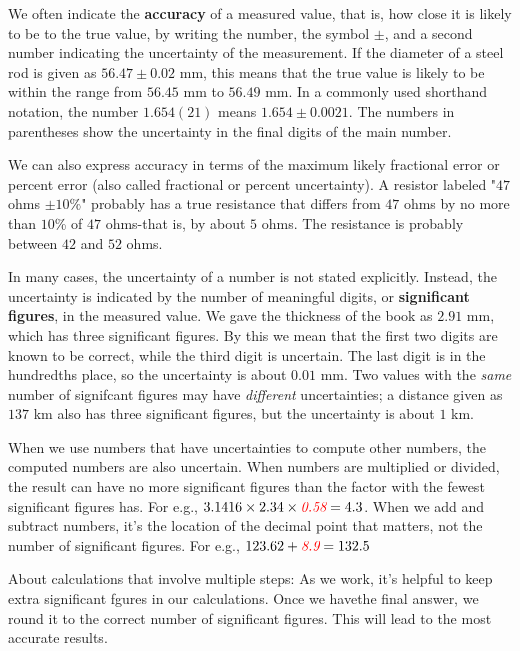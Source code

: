 We often indicate the \textbf{accuracy} of a measured value, that is, how close it is likely to be to the true value, by writing the number, the symbol $\pm$, and a second number indicating the uncertainty of the measurement. If the diameter of a steel rod is given as $56.47 \pm 0.02$ mm, this means that the true value is likely to be within the range from $56.45$ mm to $56.49$ mm. In a commonly used shorthand notation, the number $1.654(21)$ means $1.654 \pm 0.0021$. The numbers in parentheses show the uncertainty in the final digits of the main number.

We can also express accuracy in terms of the maximum likely fractional error or percent error (also called fractional or percent uncertainty). A resistor labeled "$47$ ohms $\pm 10\%$" probably has a true resistance that differs from $47$ ohms by no more than $10$\% of $47$ ohms-that is, by about $5$ ohms. The resistance is probably between $42$ and $52$ ohms. 

In many cases, the uncertainty of a number is not stated explicitly. Instead, the uncertainty is indicated by the number of meaningful digits, or \textbf{significant figures}, in the measured value. We gave the thickness of the book as $2.91$ mm, which has three significant figures. By this we mean that the first two digits are known to be correct, while the third digit is uncertain. The last digit is in the hundredths place, so the uncertainty is about $0.01$ mm. Two values with the \textit{same} number of signifcant figures may have \textit{different} uncertainties; a distance given as $137$ km also has three significant figures, but the uncertainty is about $1$ km.

When we use numbers that have uncertainties to compute other numbers, the computed numbers are also uncertain. When numbers are multiplied or divided, the result can have no more significant figures than the factor with the fewest significant figures has. For e.g., $3.1416 \times 2.34 \times \textcolor{red}{\textit{0.58}} = 4.3$. When we add and subtract numbers, it's the location of the decimal point that matters, not the number of significant figures. For e.g., $123.62 + \textcolor{red}{\textit{8.9}} = 132.5$

\begin{tipbox}
About calculations that involve multiple steps: As we work, it's helpful to keep extra significant fgures in our calculations. Once we havethe final answer, we round it to the correct number of significant figures. This will lead to the most accurate results. 
\end{tipbox}

